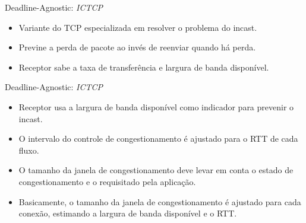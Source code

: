 \documentclass[aspectratio=169]{beamer}
\begin{document}
	
	
	\begin{frame} {Deadline-Agnostic: \textit{ICTCP}}
	                
	
	    \Large
	    \begin{itemize}
	                           
	        \item
	            Variante do TCP especializada em resolver o problema do incast.
	        \item
	            Previne a perda de pacote ao invés de reenviar  quando há perda.
	        \item
	            Receptor sabe a taxa de transferência e largura de banda disponível.
	
	    \end{itemize}
	  
	\end{frame}
	  
	
	\begin{frame} {Deadline-Agnostic: \textit{ICTCP}}
	                
	    \Large
	    \begin{itemize}
	    
	        \item
	            Receptor usa a largura de banda disponível como indicador para prevenir o incast.
	        \item
	            O intervalo do controle de congestionamento é ajustado para o RTT de cada fluxo.
	        \item
	            O tamanho da janela de congestionamento deve levar em conta o estado de congestionamento e o requisitado pela aplicação.
	        \item
	            Basicamente, o tamanho da janela de congestionamento é ajustado para cada conexão, estimando a largura de banda disponível e o RTT.
	    \end{itemize}
	  
	\end{frame}
	
\end{document}

